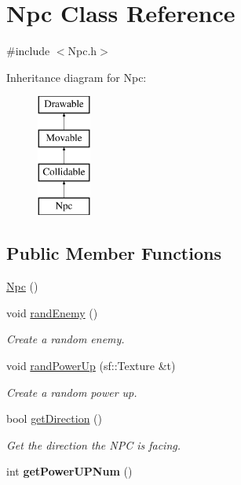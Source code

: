 \hypertarget{class_npc}{\section{Npc Class Reference}
\label{class_npc}
}


{\ttfamily \#include $<$Npc.\-h$>$}

Inheritance diagram for Npc\-:\begin{figure}[H]
\begin{center}
\leavevmode
\includegraphics[height=4.000000cm]{class_npc}
\end{center}
\end{figure}
\subsection*{Public Member Functions}
\begin{DoxyCompactItemize}
\item 
\hyperlink{class_npc_a748bee1d096f0dc38a80f2db64186644}{Npc} ()
\item 
void \hyperlink{class_npc_a37c66a6ffa287ad975f42c1ab1d65310}{rand\-Enemy} ()
\begin{DoxyCompactList}\small\item\em Create a random enemy. \end{DoxyCompactList}\item 
void \hyperlink{class_npc_a8ab8f95be18d4add56959b2620e51a2b}{rand\-Power\-Up} (sf\-::\-Texture \&t)
\begin{DoxyCompactList}\small\item\em Create a random power up. \end{DoxyCompactList}\item 
\hypertarget{class_npc_aade5b490d2e23a8a53af6f44c1fc1905}{bool \hyperlink{class_npc_aade5b490d2e23a8a53af6f44c1fc1905}{get\-Direction} ()}\label{class_npc_aade5b490d2e23a8a53af6f44c1fc1905}

\begin{DoxyCompactList}\small\item\em Get the direction the N\-P\-C is facing. \end{DoxyCompactList}\item 
\hypertarget{class_npc_aa2e93dd316c37c06205bcc90027b8c73}{int {\bfseries get\-Power\-U\-P\-Num} ()}\label{class_npc_aa2e93dd316c37c06205bcc90027b8c73}

\end{DoxyCompactItemize}
